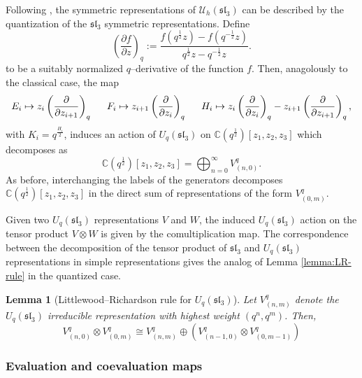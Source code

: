 \documentclass[12pt,oneside,reqno]{amsart}
\def\C{\mathbb{C}}
\newtheorem{lema}{\bf Lemma}
\numberwithin{teorema}{section}
\numberwithin{definicion}{section}
\numberwithin{lema}{section}
\numberwithin{conjetura}{section}
\numberwithin{proposicion}{section}
\def\sl{\mathfrak{sl}}
\def\Uh{\mathcal{U}_h}
\def\Uq{U_q}
\begin{document}
Following \cite{gruen22}, the symmetric representations of $\Uh(\sl_3)$ can be described by the quantization of the $\sl_3$ symmetric representations. Define 
\begin{equation*}
    \left(\frac{\partial f}{\partial z}\right)_q := \frac{f\left(q^\frac{1}{2}z\right)-f\left(q^{-\frac{1}{2}}z\right)}{q^\frac{1}{2}z-q^{-\frac{1}{2}}z}.
\end{equation*}
to be a suitably normalized $q$--derivative of the function $f$. Then, anagolously to the classical case, the map 
\begin{equation}\label{eq:qEi-Fi-Hi}
    E_i \mapsto z_i\left(\frac{\partial}{\partial z_{i+1}}\right)_q \hspace{1.5em} F_i \mapsto z_{i+1}\left(\frac{\partial}{\partial z_{i}}\right)_q \hspace{1.5em} H_i \mapsto z_i\left(\frac{\partial}{\partial z_{i}}\right)_q - z_{i+1}\left(\frac{\partial}{\partial z_{i+1}}\right)_q,
\end{equation}
with $K_i = q^{\frac{H_i}{2}}$, induces an action of $\Uq(\sl_3)$ on $\C(q^{\frac{1}{2}})[z_1,z_2,z_3]$ which decomposes as
\begin{equation*}
    \C(q^{\frac{1}{2}})[z_1,z_2,z_3] = \bigoplus_{n=0}^{\infty} V^q_{(n,0)}.
\end{equation*}
As before, interchanging the labels of the generators decomposes $\C(q^{\frac{1}{2}})[z_1,z_2,z_3]$ in the direct sum of representations of the form $V^q_{(0,m)}$.

Given two $\Uq(\sl_3)$ representations $V$ and $W$, the induced $\Uq(\sl_3)$ action on the tensor product $V\otimes W$ is given by the comultiplication map. The correspondence between the decomposition of the tensor product of $\sl_3$ and $\Uq(\sl_3)$ representations in simple representations \cite{KRT-book} gives the analog of Lemma \ref{lemma:LR-rule} in the quantized case.

\begin{lema}[Littlewood--Richardson rule for $\Uq(\sl_3)$]\label{lemma:LR-rule-Uqsl3} Let $V^q_{(n,m)}$ denote the $\Uq(\sl_3)$ irreducible representation with highest weight $(q^n,q^m)$. Then,
    \begin{equation}\label{eq:tensorprod-decomposition-quantum}
        V^q_{(n,0)}\otimes V^q_{(0,m)} \cong V^q_{(n,m)} \oplus \left(V^q_{(n-1,0)}\otimes V^q_{(0,m-1)} \right)
\end{equation}
\end{lema}

\subsubsection{Evaluation and coevaluation maps}
\end{document}
